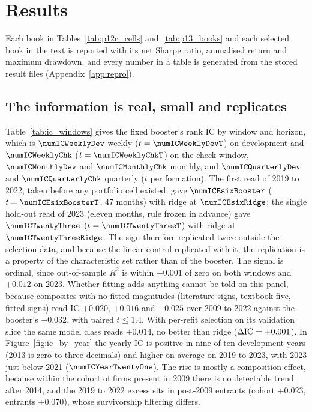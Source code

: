 \section{Results}\label{sec:results}

Each book in Tables~\ref{tab:p12c_cells} and~\ref{tab:p13_books} and each selected book in the text is reported with its net Sharpe ratio, annualised return and maximum drawdown, and every number in a table is generated from the stored result files (Appendix~\ref{app:repro}).

\subsection{The information is real, small and replicates}\label{sec:res_info}

Table~\ref{tab:ic_windows} gives the fixed booster's rank IC by window and horizon, which is $\numICWeeklyDev$ weekly ($t=\numICWeeklyDevT$) on development and $\numICWeeklyChk$ ($t=\numICWeeklyChkT$) on the check window, $\numICMonthlyDev$ and $\numICMonthlyChk$ monthly, and $\numICQuarterlyDev$ and $\numICQuarterlyChk$ quarterly ($t$ per formation). The first read of 2019 to 2022, taken before any portfolio cell existed, gave $\numICEsixBooster$ ($t=\numICEsixBoosterT$, 47 months) with ridge at $\numICEsixRidge$; the single hold-out read of 2023 (eleven months, rule frozen in advance) gave $\numICTwentyThree$ ($t=\numICTwentyThreeT$) with ridge at $\numICTwentyThreeRidge$. The sign therefore replicated twice outside the selection data, and because the linear control replicated with it, the replication is a property of the characteristic set rather than of the booster. The signal is ordinal, since out-of-sample $R^2$ is within $\pm0.001$ of zero on both windows and $+0.012$ on 2023. Whether fitting adds anything cannot be told on this panel, because composites with no fitted magnitudes (literature signs, textbook five, fitted signs) read IC $+0.020$, $+0.016$ and $+0.025$ over 2009 to 2022 against the booster's $+0.032$, with paired $t\le1.4$. With per-refit selection on its validation slice the same model class reads $+0.014$, no better than ridge ($\Delta\mathrm{IC}=+0.001$). In Figure~\ref{fig:ic_by_year} the yearly IC is positive in nine of ten development years (2013 is zero to three decimals) and higher on average on 2019 to 2023, with 2023 just below 2021 ($\numICYearTwentyOne$). The rise is mostly a composition effect, because within the cohort of firms present in 2009 there is no detectable trend after 2014, and the 2019 to 2022 excess sits in post-2009 entrants (cohort $+0.023$, entrants $+0.070$), whose survivorship filtering differs.


